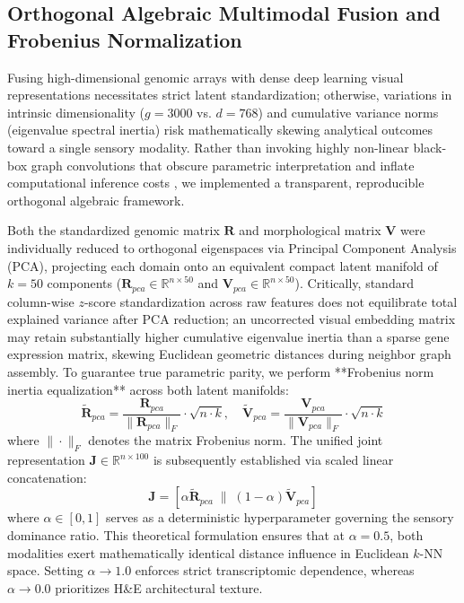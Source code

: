 \documentclass[11pt, a4paper]{article}
\begin{document}
\subsection{Orthogonal Algebraic Multimodal Fusion and Frobenius Normalization}
Fusing high-dimensional genomic arrays with dense deep learning visual representations necessitates strict latent standardization; otherwise, variations in intrinsic dimensionality ($g=3000$ vs. $d=768$) and cumulative variance norms (eigenvalue spectral inertia) risk mathematically skewing analytical outcomes toward a single sensory modality. Rather than invoking highly non-linear black-box graph convolutions that obscure parametric interpretation and inflate computational inference costs \cite{yang2025staig}, we implemented a transparent, reproducible orthogonal algebraic framework.

Both the standardized genomic matrix $\mathbf{R}$ and morphological matrix $\mathbf{V}$ were individually reduced to orthogonal eigenspaces via Principal Component Analysis (PCA), projecting each domain onto an equivalent compact latent manifold of $k=50$ components ($\mathbf{R}_{pca} \in \mathbb{R}^{n \times 50}$ and $\mathbf{V}_{pca} \in \mathbb{R}^{n \times 50}$). Critically, standard column-wise $z$-score standardization across raw features does not equilibrate total explained variance after PCA reduction; an uncorrected visual embedding matrix may retain substantially higher cumulative eigenvalue inertia than a sparse gene expression matrix, skewing Euclidean geometric distances during neighbor graph assembly. To guarantee true parametric parity, we perform **Frobenius norm inertia equalization** across both latent manifolds:
\begin{equation}
\tilde{\mathbf{R}}_{pca} = \frac{\mathbf{R}_{pca}}{\|\mathbf{R}_{pca}\|_F} \cdot \sqrt{n \cdot k}, \quad \tilde{\mathbf{V}}_{pca} = \frac{\mathbf{V}_{pca}}{\|\mathbf{V}_{pca}\|_F} \cdot \sqrt{n \cdot k}
\end{equation}
where $\|\cdot\|_F$ denotes the matrix Frobenius norm. The unified joint representation $\mathbf{J} \in \mathbb{R}^{n \times 100}$ is subsequently established via scaled linear concatenation:
\begin{equation}
\mathbf{J} = \left[ \alpha \tilde{\mathbf{R}}_{pca} \;\Big\|\; (1-\alpha) \tilde{\mathbf{V}}_{pca} \right]
\end{equation}
where $\alpha \in [0, 1]$ serves as a deterministic hyperparameter governing the sensory dominance ratio. This theoretical formulation ensures that at $\alpha = 0.5$, both modalities exert mathematically identical distance influence in Euclidean $k$-NN space. Setting $\alpha \to 1.0$ enforces strict transcriptomic dependence, whereas $\alpha \to 0.0$ prioritizes H\&E architectural texture.
\end{document}
